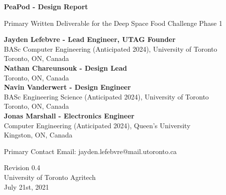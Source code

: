 \documentclass{report}
\begin{document}
\begin{titlepage}
    \begin{center}
        \vspace*{1.2cm}

        \textbf{\large{PeaPod - Design Report}}

        \vspace{0.5cm}

        Primary Written Deliverable for the Deep Space Food Challenge Phase 1

        \vfill \small{

            \textbf{Jayden Lefebvre - Lead Engineer, UTAG Founder}\\
            BASc Computer Engineering (Anticipated 2024), University of Toronto\\
            Toronto, ON, Canada\\
            \vspace{.5cm}
            \textbf{Nathan Chareunsouk - Design Lead}\\Toronto, ON, Canada\\
            \vspace{.5cm}
            \textbf{Navin Vanderwert - Design Engineer}\\
            BASc Engineering Science (Anticipated 2024), University of Toronto\\
            Toronto, ON, Canada\\
            \vspace{.5cm}
            \textbf{Jonas Marshall - Electronics Engineer}\\
            Computer Engineering (Anticipated 2024), Queen's University\\
            Kingston, ON, Canada

        }

        \vspace{1cm}

        Primary Contact Email: jayden.lefebvre@mail.utoronto.ca

        \vspace{.75cm}

        Revision 0.4\\
        University of Toronto Agritech\\
        July 21st, 2021

    \end{center}
\end{titlepage}

\thispagestyle{plain}
\end{document}
